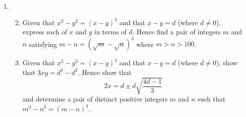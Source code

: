 \documentclass[a4, 11pt]{report}
\newlength{\qspace}
\newcounter{qnumber}
\newenvironment{question}%
 {\vspace{\qspace}
  \begin{enumerate}[\bfseries 1\quad][10]%
    \setcounter{enumi}{\value{qnumber}}%
    \item%
 }
{
  \end{enumerate}
  \filbreak
  \stepcounter{qnumber}
 }
\newenvironment{questionparts}[1][1]%
 {
  \begin{enumerate}[\bfseries (i)]%
    \setcounter{enumii}{#1}
    \addtocounter{enumii}{-1}
    \setlength{\itemsep}{5mm}
    \setlength{\parskip}{8pt}
 }
 {
  \end{enumerate}
 }
\begin{document}
\begin{question}
\begin{questionparts}
\item
Given that 
$x^2 - y^2 = \left( x - y \right)^3$ 
and that $x-y = d$ (where $d \neq 0$), 
express each of $x$ and $y$ in terms of $d$. 
Hence find a pair of integers $m$ and $n$
satisfying $m-n = \left( \sqrt {m} - \sqrt{n} \right)^3$
where $m > n > 100$.

\item
Given that $x^3 - y^3 = \left( x - y \right)^4$ 
and that $x-y = d$ (where $d \neq 0$),
show that $3xy = d^3 - d^2$. Hence show that
\[
2x = d \pm d \sqrt {\frac{4d-1 }{3}}
\]
and determine a pair of distinct positive integers $m$ and $n$
such that $m^3 - n^3 = \left( m - n \right)^4$.

\end{questionparts}
\end{question}
	
\end{document}

